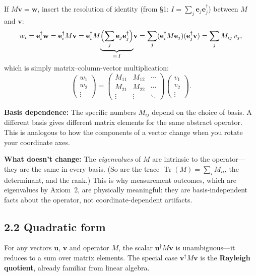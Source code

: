 \documentclass[12pt,a4paper]{article}
\begin{document}
If $M\mathbf{v}=\mathbf{w}$, insert the resolution of identity (from \S1: $I = \sum_j \mathbf{e}_j\mathbf{e}_j^\dagger$) between $M$ and $\mathbf{v}$:
\[
    w_i = \mathbf{e}_i^\dagger\mathbf{w} = \mathbf{e}_i^\dagger M\mathbf{v}
    = \mathbf{e}_i^\dagger M\!\underbrace{\Bigl(\sum_j \mathbf{e}_j\mathbf{e}_j^\dagger\Bigr)}_{=\,I}\!\mathbf{v}
    = \sum_j (\mathbf{e}_i^\dagger M\mathbf{e}_j)(\mathbf{e}_j^\dagger\mathbf{v}) = \sum_j M_{ij}\,v_j,
\]
which is simply matrix--column-vector multiplication:
\[
    \begin{pmatrix}w_1\\w_2\\\vdots\end{pmatrix}
    = \begin{pmatrix}M_{11}&M_{12}&\cdots\\M_{21}&M_{22}&\cdots\\\vdots&\vdots&\ddots\end{pmatrix}
    \begin{pmatrix}v_1\\v_2\\\vdots\end{pmatrix}.
\]

\medskip
\noindent\textbf{Basis dependence:} The specific numbers $M_{ij}$ depend on the choice of basis.  A different basis gives different matrix elements for the same abstract operator.  This is analogous to how the components of a vector change when you rotate your coordinate axes.

\medskip
\noindent\textbf{What doesn't change:} The \emph{eigenvalues} of $M$ are intrinsic to the operator---they are the same in every basis.  (So are the trace $\operatorname{Tr}(M) = \sum_i M_{ii}$, the determinant, and the rank.)  This is why measurement outcomes, which are eigenvalues by Axiom~2, are physically meaningful: they are basis-independent facts about the operator, not coordinate-dependent artifacts.

\subsection{2.2 Quadratic form}
For any vectors $\mathbf{u}$, $\mathbf{v}$ and operator $M$, the scalar $\mathbf{u}^\dagger M\mathbf{v}$ is unambiguous---it reduces to a sum over matrix elements.  The special case $\mathbf{v}^\dagger M\mathbf{v}$ is the \textbf{Rayleigh quotient}, already familiar from linear algebra.

\end{document}
